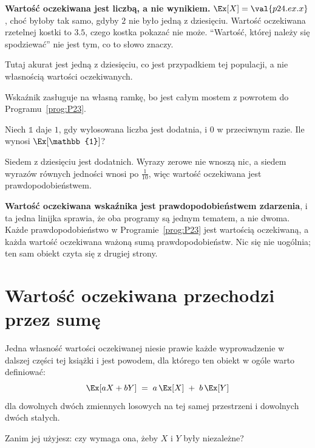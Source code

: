 \begin{fr}

\begin{notationbox}
\textbf{Wartość oczekiwana jest liczbą, a nie wynikiem.}
$\Ex[X] = \val{p24.ex.x}$, choć byłoby tak samo, gdyby $2$ nie było jedną z
dziesięciu. Wartość oczekiwana rzetelnej kostki to $\num{3.5}$, czego kostka
pokazać nie może. \enquote{Wartość, której należy się spodziewać} nie jest
tym, co to słowo znaczy.
\end{notationbox}

Tutaj akurat jest jedną z dziesięciu, co jest przypadkiem tej populacji, a nie
własnością wartości oczekiwanych.
\end{fr}

\begin{fr}
Wskaźnik zasługuje na własną ramkę, bo jest całym mostem z powrotem do
Programu~\ref{prog:P23}.

Niech $\mathbb{1}$ daje $1$, gdy wylosowana liczba jest dodatnia, i $0$ w
przeciwnym razie. Ile wynosi $\Ex[\mathbb{1}]$?
\dotline
\nextframe
\end{fr}

\begin{fr}

Siedem z dziesięciu jest dodatnich. Wyrazy zerowe nie wnoszą nic, a siedem
wyrazów równych jedności wnosi po $\frac{1}{10}$, więc wartość oczekiwana jest
prawdopodobieństwem.

\textbf{Wartość oczekiwana wskaźnika jest prawdopodobieństwem zdarzenia}, i ta
jedna linijka sprawia, że oba programy są jednym tematem, a nie dwoma. Każde
prawdopodobieństwo w Programie~\ref{prog:P23} jest wartością oczekiwaną, a
każda wartość oczekiwana ważoną sumą prawdopodobieństw. Nic się nie uogólnia;
ten sam obiekt czyta się z drugiej strony.

\end{fr}

\section{Wartość oczekiwana przechodzi przez sumę}
\label{sec:P24-linearity}

\begin{fr}
Jedna własność wartości oczekiwanej niesie prawie każde wyprowadzenie w
dalszej części tej książki i jest powodem, dla którego ten obiekt w ogóle
warto definiować:
\[ \Ex[aX + bY] \;=\; a\,\Ex[X] \;+\; b\,\Ex[Y] \]
dla dowolnych dwóch zmiennych losowych na tej samej przestrzeni i dowolnych
dwóch stałych.

Zanim jej użyjesz: czy wymaga ona, żeby $X$ i $Y$ były niezależne?
\dotline
\nextframe
\end{fr}

